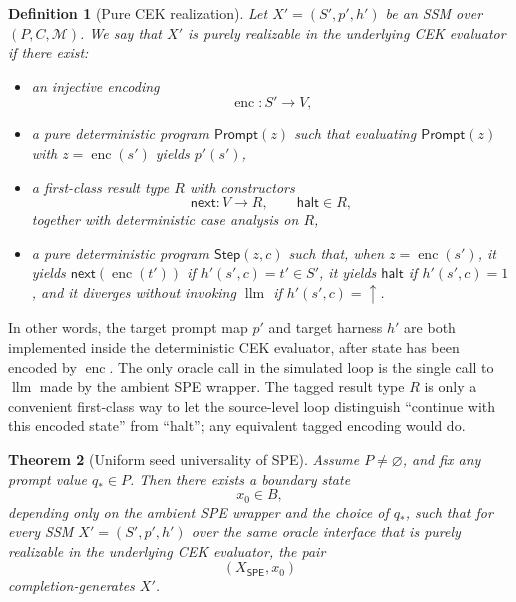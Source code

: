 \documentclass[11pt]{article}
\newtheorem{definition}{Definition}[section]
\newtheorem{theorem}[definition]{Theorem}
\newcommand{\SPE}{\mathsf{SPE}}
\newcommand{\enc}{\operatorname{enc}}
\newcommand{\llm}{\operatorname{llm}}
\begin{document}
\begin{definition}[Pure CEK realization]\label{def:pure-realization}
Let $X'=(S',p',h')$ be an SSM over $(P,C,\mathcal{M})$. We say that $X'$ is \emph{purely realizable in the underlying CEK evaluator} if there exist:
\begin{itemize}
    \item an injective encoding
    \[
    \enc:S'\to V,
    \]
    \item a pure deterministic program $\mathsf{Prompt}(z)$ such that evaluating $\mathsf{Prompt}(z)$ with $z=\enc(s')$ yields $p'(s')$,
    \item a first-class result type $R$ with constructors
    \[
    \mathsf{next}:V\to R,
    \qquad
    \mathsf{halt}\in R,
    \]
    together with deterministic case analysis on $R$,
    \item a pure deterministic program $\mathsf{Step}(z,c)$ such that, when $z=\enc(s')$, it yields $\mathsf{next}(\enc(t'))$ if $h'(s',c)=t'\in S'$, it yields $\mathsf{halt}$ if $h'(s',c)=1$, and it diverges without invoking $\llm$ if $h'(s',c)=\uparrow$.
\end{itemize}
\end{definition}

In other words, the target prompt map $p'$ and target harness $h'$ are both implemented inside the deterministic CEK evaluator, after state has been encoded by $\enc$. The only oracle call in the simulated loop is the single call to $\llm$ made by the ambient SPE wrapper. The tagged result type $R$ is only a convenient first-class way to let the source-level loop distinguish ``continue with this encoded state'' from ``halt''; any equivalent tagged encoding would do.

\begin{theorem}[Uniform seed universality of SPE]\label{thm:main}
Assume $P\neq\varnothing$, and fix any prompt value $q_{\ast}\in P$. Then there exists a boundary state
\[
x_0\in B,
\]
depending only on the ambient SPE wrapper and the choice of $q_{\ast}$, such that for every SSM $X'=(S',p',h')$ over the same oracle interface that is purely realizable in the underlying CEK evaluator, the pair
\[
(X_{\SPE},x_0)
\]
completion-generates $X'$.
\end{theorem}
\end{document}
